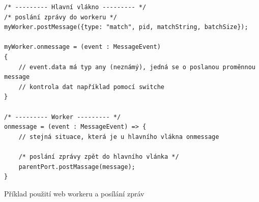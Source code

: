 \begin{code}[!ht]
	\begin{verbatim}
/* --------- Hlavní vlákno --------- */
/* poslání zprávy do workeru */
myWorker.postMessage({type: "match", pid, matchString, batchSize});

myWorker.onmessage = (event : MessageEvent)
{
	// event.data má typ any (neznámý), jedná se o poslanou proměnnou message 
	// kontrola dat například pomocí switche
}

/* --------- Worker --------- */
onmessage = (event : MessageEvent) => {
	// stejná situace, která je u hlavního vlákna onmessage

	/* poslání zprávy zpět do hlavního vlánka */
	parentPort.postMassage(message);
}
	\end{verbatim}
	\caption{Příklad použití web workeru a posílání zpráv}
	\label{code:worker}
\end{code}
\endinput